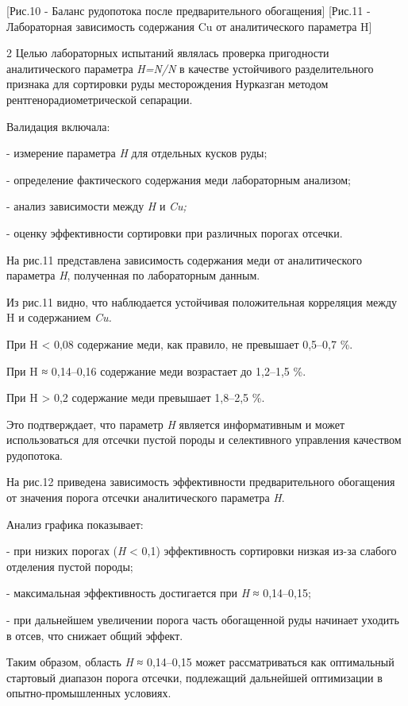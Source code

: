 \begin{figs}
    [Рис.10 - Баланс рудопотока после предварительного обогащения]
    [Рис.11 - Лабораторная зависимость содержания Cu от
аналитического параметра H]
\end{figs}

\begin{multicols}{2}
Целью лабораторных испытаний являлась проверка пригодности
аналитического параметра \emph{H=N/N}
в качестве устойчивого разделительного признака для сортировки руды
месторождения Нурказган методом рентгенорадиометрической сепарации.

Валидация включала:

- измерение параметра \emph{H} для отдельных кусков руды;

- определение фактического содержания меди лабораторным анализом;

- анализ зависимости между \emph{H} и \emph{Cu;}

- оценку эффективности сортировки при различных порогах отсечки.

На рис.11 представлена зависимость содержания меди от аналитического
параметра \emph{H}, полученная по лабораторным данным.

Из рис.11 видно, что наблюдается устойчивая положительная корреляция
между H и содержанием \emph{Cu.}

При H <{} 0,08 содержание меди, как правило, не превышает
0,5--0,7 \%.

При H ≈ 0,14--0,16 содержание меди возрастает до 1,2--1,5 \%.

При H \textgreater{} 0,2 содержание меди превышает 1,8--2,5 \%.

Это подтверждает, что параметр \emph{H} является информативным и может
использоваться для отсечки пустой породы и селективного управления
качеством рудопотока.

На рис.12 приведена зависимость эффективности предварительного
обогащения от значения порога отсечки аналитического параметра \emph{H}.

Анализ графика показывает:

- при низких порогах (\emph{H} <{} 0,1) эффективность сортировки
низкая из-за слабого отделения пустой породы;

- максимальная эффективность достигается при \emph{H} ≈ 0,14--0,15;

- при дальнейшем увеличении порога часть обогащенной руды начинает
уходить в отсев, что снижает общий эффект.

Таким образом, область \emph{H} ≈ 0,14--0,15 может рассматриваться как
оптимальный стартовый диапазон порога отсечки, подлежащий дальнейшей
оптимизации в опытно-промышленных условиях.
\end{multicols}

